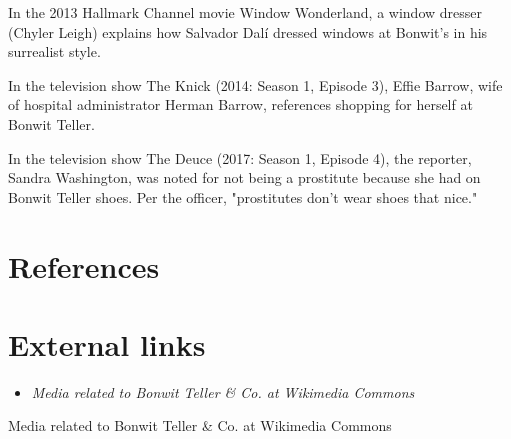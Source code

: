 In the 2013 Hallmark Channel movie Window Wonderland, a window dresser
(Chyler Leigh) explains how Salvador Dalí dressed windows at Bonwit's in
his surrealist style.

In the television show The Knick (2014: Season 1, Episode 3), Effie
Barrow, wife of hospital administrator Herman Barrow, references
shopping for herself at Bonwit Teller.

In the television show The Deuce (2017: Season 1, Episode 4), the
reporter, Sandra Washington, was noted for not being a prostitute
because she had on Bonwit Teller shoes. Per the officer, "prostitutes
don't wear shoes that nice."

\section{References}\label{references}

\section{External links}\label{external-links}

\begin{itemize}
\item
  \emph{Media related to Bonwit Teller \& Co. at Wikimedia Commons}
\end{itemize}

Media related to Bonwit Teller \& Co. at Wikimedia Commons
